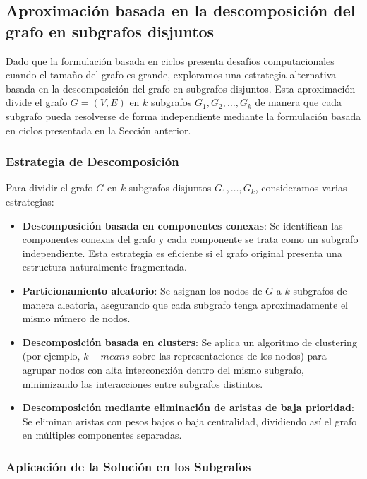 \documentclass[twocolumn, fontsize=10pt]{article}
\theoremstyle{definition} %
\begin{document}
\subsection{Aproximación basada en la descomposición del grafo en subgrafos disjuntos}

Dado que la formulación basada en ciclos presenta desafíos computacionales cuando el tamaño del grafo es grande, exploramos una estrategia alternativa basada en la descomposición del grafo en subgrafos disjuntos. Esta aproximación divide el grafo \( G = (V, E) \) en \( k \) subgrafos \( G_1, G_2, \dots, G_k \) de manera que cada subgrafo pueda resolverse de forma independiente mediante la formulación basada en ciclos presentada en la Sección anterior.


\subsubsection{Estrategia de Descomposición}

Para dividir el grafo \( G \) en \( k \) subgrafos disjuntos \( G_1, \dots, G_k \), consideramos varias estrategias:

\begin{itemize}
    \item \textbf{Descomposición basada en componentes conexas}: Se identifican las componentes conexas del grafo y cada componente se trata como un subgrafo independiente. Esta estrategia es eficiente si el grafo original presenta una estructura naturalmente fragmentada.
    \item \textbf{Particionamiento aleatorio}: Se asignan los nodos de \( G \) a \( k \) subgrafos de manera aleatoria, asegurando que cada subgrafo tenga aproximadamente el mismo número de nodos.
    \item \textbf{Descomposición basada en clusters}: Se aplica un algoritmo de clustering (por ejemplo, \(k-means\) sobre las representaciones de los nodos) para agrupar nodos con alta interconexión dentro del mismo subgrafo, minimizando las interacciones entre subgrafos distintos.
    \item \textbf{Descomposición mediante eliminación de aristas de baja prioridad}: Se eliminan aristas con pesos bajos o baja centralidad, dividiendo así el grafo en múltiples componentes separadas.
\end{itemize}

\subsubsection{Aplicación de la Solución en los Subgrafos}
\end{document}
